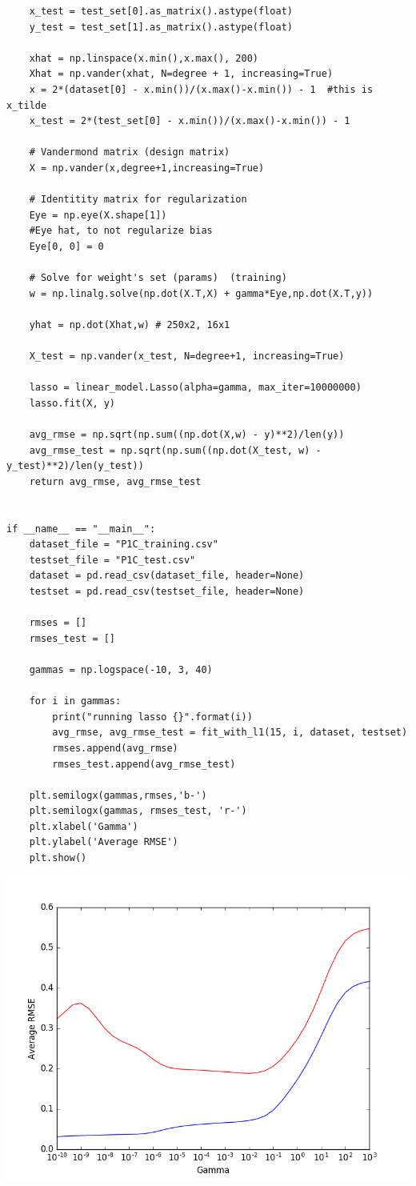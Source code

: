 \documentclass[12pt]{article}
\begin{document}
\begin{flushleft}
\begin{lstlisting}
	x_test = test_set[0].as_matrix().astype(float)
	y_test = test_set[1].as_matrix().astype(float)
	
	xhat = np.linspace(x.min(),x.max(), 200)
	Xhat = np.vander(xhat, N=degree + 1, increasing=True)
	x = 2*(dataset[0] - x.min())/(x.max()-x.min()) - 1  #this is x_tilde
	x_test = 2*(test_set[0] - x.min())/(x.max()-x.min()) - 1
	
	# Vandermond matrix (design matrix)
	X = np.vander(x,degree+1,increasing=True)
	
	# Identitity matrix for regularization
	Eye = np.eye(X.shape[1])
	#Eye hat, to not regularize bias
	Eye[0, 0] = 0
	
	# Solve for weight's set (params)  (training)
	w = np.linalg.solve(np.dot(X.T,X) + gamma*Eye,np.dot(X.T,y))
	
	yhat = np.dot(Xhat,w) # 250x2, 16x1
	
	X_test = np.vander(x_test, N=degree+1, increasing=True)
	
	lasso = linear_model.Lasso(alpha=gamma, max_iter=10000000)
	lasso.fit(X, y)
	
	avg_rmse = np.sqrt(np.sum((np.dot(X,w) - y)**2)/len(y))
	avg_rmse_test = np.sqrt(np.sum((np.dot(X_test, w) - y_test)**2)/len(y_test))
	return avg_rmse, avg_rmse_test


if __name__ == "__main__":
	dataset_file = "P1C_training.csv"
	testset_file = "P1C_test.csv"
	dataset = pd.read_csv(dataset_file, header=None)
	testset = pd.read_csv(testset_file, header=None)
	
	rmses = []
	rmses_test = []
	
	gammas = np.logspace(-10, 3, 40)
	
	for i in gammas:
		print("running lasso {}".format(i))
		avg_rmse, avg_rmse_test = fit_with_l1(15, i, dataset, testset)
		rmses.append(avg_rmse)
		rmses_test.append(avg_rmse_test)
	
	plt.semilogx(gammas,rmses,'b-')
	plt.semilogx(gammas, rmses_test, 'r-')
	plt.xlabel('Gamma')
	plt.ylabel('Average RMSE')
	plt.show()
\end{lstlisting}
		\includegraphics[scale=0.5]{HW1_1F.png}
		\label{fig:graph 1F}
		

\end{flushleft}
\end{document}
